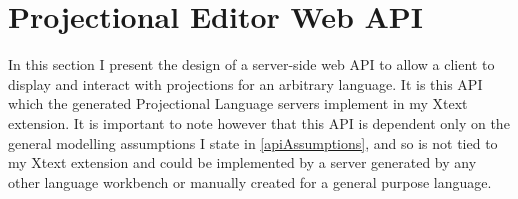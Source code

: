 \documentclass{article}
\begin{document}
\section{Projectional Editor Web API}\label{api}
In this section I present the design of a server-side web API to allow a client to display and interact with projections for an arbitrary language. It is this API which the generated Projectional Language servers implement in my Xtext extension. It is important to note however that this API is dependent only on the general modelling assumptions I state in \ref{apiAssumptions}, and so is not tied to my Xtext extension and could be implemented by a server generated by any other language workbench or manually created for a general purpose language.
\end{document}

